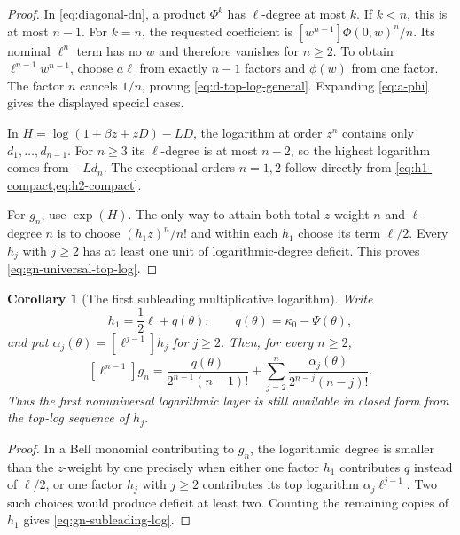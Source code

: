 \documentclass[11pt,oneside]{article}
\numberwithin{equation}{section}
\newtheorem{corollary}[theorem]{Corollary}
\theoremstyle{definition}
\theoremstyle{remark}
\begin{document}
\begin{proof}
In \cref{eq:diagonal-dn}, a product $\Phi^k$ has $\ell$-degree at most $k$.  If $k<n$, this is at most $n-1$.  For $k=n$, the requested coefficient is $[w^{n-1}]\Phi(0,w)^n/n$.  Its nominal $\ell^n$ term has no $w$ and therefore vanishes for $n\ge2$.  To obtain $\ell^{n-1}w^{n-1}$, choose $a\ell$ from exactly $n-1$ factors and $\phi(w)$ from one factor.  The factor $n$ cancels $1/n$, proving \cref{eq:d-top-log-general}.  Expanding \cref{eq:a-phi} gives the displayed special cases.

In $H=\log(1+\beta z+zD)-LD$, the logarithm at order $z^n$ contains only $d_1,\ldots,d_{n-1}$.  For $n\ge3$ its $\ell$-degree is at most $n-2$, so the highest logarithm comes from $-Ld_n$.  The exceptional orders $n=1,2$ follow directly from \cref{eq:h1-compact,eq:h2-compact}.

For $g_n$, use $\exp(H)$.  The only way to attain both total $z$-weight $n$ and $\ell$-degree $n$ is to choose $(h_1z)^n/n!$ and within each $h_1$ choose its term $\ell/2$.  Every $h_j$ with $j\ge2$ has at least one unit of logarithmic-degree deficit.  This proves \cref{eq:gn-universal-top-log}.
\end{proof}

\begin{corollary}[The first subleading multiplicative logarithm]
\label{cor:subleading-log}
Write
\begin{equation}
 h_1=\frac12\ell+q(\theta),
 \qquad q(\theta)=\kappa_0-\Psi(\theta),
 \label{eq:q-def}
\end{equation}
and put $\alpha_j(\theta)=[\ell^{j-1}]h_j$ for $j\ge2$.  Then, for every $n\ge2$,
\begin{equation}
 \boxed{
 [\ell^{n-1}]g_n=
 \frac{q(\theta)}{2^{n-1}(n-1)!}
 +\sum_{j=2}^{n}
 \frac{\alpha_j(\theta)}{2^{n-j}(n-j)!}.}
 \label{eq:gn-subleading-log}
\end{equation}
Thus the first nonuniversal logarithmic layer is still available in closed form from the top-log sequence of $h_j$.
\end{corollary}

\begin{proof}
In a Bell monomial contributing to $g_n$, the logarithmic degree is smaller than the $z$-weight by one precisely when either one factor $h_1$ contributes $q$ instead of $\ell/2$, or one factor $h_j$ with $j\ge2$ contributes its top logarithm $\alpha_j\ell^{j-1}$.  Two such choices would produce deficit at least two.  Counting the remaining copies of $h_1$ gives \cref{eq:gn-subleading-log}.
\end{proof}
\end{document}

